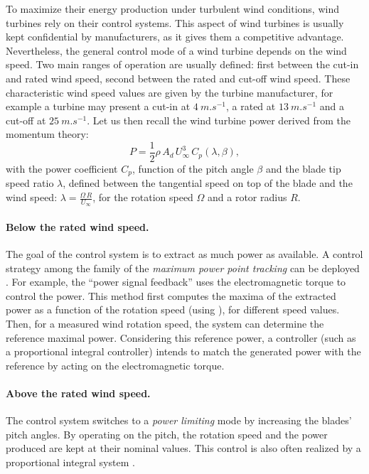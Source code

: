 To maximize their energy production under turbulent wind conditions, wind turbines rely on their control systems. 
This aspect of wind turbines is usually kept confidential by manufacturers, as it gives them a competitive advantage.  
Nevertheless, the general control mode of a wind turbine depends on the wind speed. 
Two main ranges of operation are usually defined: first between the cut-in and rated wind speed, second between the rated and cut-off wind speed. 
These characteristic wind speed values are given by the turbine manufacturer, for example a turbine may present a cut-in at $4~\si{m.s^{-1}}$, a rated at $13~\si{m.s^{-1}}$ and a cut-off at $25~\si{m.s^{-1}}$. 
Let us then recall the wind turbine power derived from the momentum theory: 
\begin{equation}
    P = \frac12 \rho \, A_d \, U_\infty^3 \, C_p(\lambda, \beta), 
    \label{eq:power_wt}
\end{equation}
with the power coefficient $C_p$, function of the pitch angle $\beta$ and the blade tip speed ratio $\lambda$, defined between the tangential speed on top of the blade and the wind speed: $\lambda = \frac{\Omega \, R}{U_\infty}$, for the rotation speed $\Omega$ and a rotor radius $R$. 

\paragraph{Below the rated wind speed.}
The goal of the control system is to extract as much power as available. 
A control strategy among the family of the \textit{maximum power point tracking} can be deployed \citep{abdullah_2012_control_review}.   
For example, the ``power signal feedback'' uses the electromagnetic torque to control the power. 
This method first computes the maxima of the extracted power as a function of the rotation speed (using ), for different speed values. 
Then, for a measured wind rotation speed, the system can determine the reference maximal power. 
Considering this reference power, a controller (such as a proportional integral controller) intends to match the generated power with the reference by acting on the electromagnetic torque. 


\paragraph{Above the rated wind speed.}
The control system switches to a \textit{power limiting} mode by increasing the blades' pitch angles. 
By operating on the pitch, the rotation speed and the power produced are kept at their nominal values. 
This control is also often realized by a proportional integral system \citep{bossanyi_2003_pitch_control}. 

